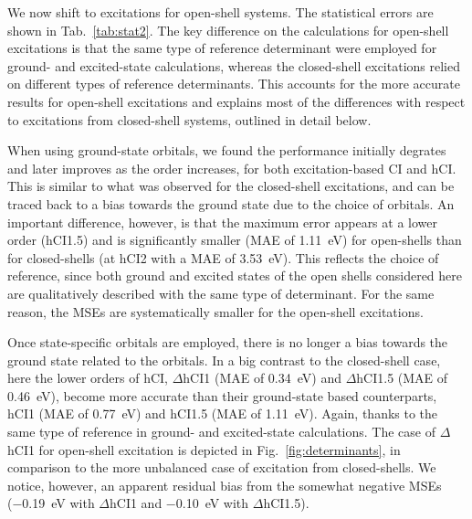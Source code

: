 \documentclass[aip,jcp,reprint,noshowkeys,superscriptaddress]{revtex4-1}
\begin{document}
We now shift to excitations for open-shell systems.
The statistical errors are shown in Tab.~\ref{tab:stat2}.
The key difference on the calculations for open-shell excitations is that the same type of reference determinant were employed for ground- and excited-state calculations,
whereas the closed-shell excitations relied on different types of reference determinants.
This accounts for the more accurate results for open-shell excitations and explains most of the differences with respect to excitations from closed-shell systems, outlined in detail below.


When using ground-state orbitals, we found the performance initially degrates and later improves as the order increases, for both excitation-based CI and hCI.
This is similar to what was observed for the closed-shell excitations, 
and can be traced back to a bias towards the ground state due to the choice of orbitals.
An important difference, however, is that the maximum error appears at a lower order (hCI1.5) and is significantly smaller (MAE of \SI{1.11}{\eV}) for open-shells
than for closed-shells (at hCI2 with a MAE of \SI{3.53}{\eV}).
This reflects the choice of reference, since both ground and excited states of the open shells considered here are qualitatively described with the same type of determinant.
For the same reason, the MSEs are systematically smaller for the open-shell excitations.

Once state-specific orbitals are employed, there is no longer a bias towards the ground state related to the orbitals.
In a big contrast to the closed-shell case, here the lower orders of hCI, $\Delta$hCI1 (MAE of \SI{0.34}{\eV}) and $\Delta$hCI1.5 (MAE of \SI{0.46}{\eV}), 
become more accurate than their ground-state based counterparts, hCI1 (MAE of \SI{0.77}{\eV}) and hCI1.5 (MAE of \SI{1.11}{\eV}).
Again, thanks to the same type of reference in ground- and excited-state calculations.
The case of $\Delta$hCI1 for open-shell excitation is depicted in Fig.~\ref{fig:determinants}, in comparison to the more unbalanced case of excitation from closed-shells.
We notice, however, an apparent residual bias from the somewhat negative MSEs (\SI{-0.19}{\eV} with $\Delta$hCI1 and \SI{-0.10}{\eV} with $\Delta$hCI1.5).
\end{document}
